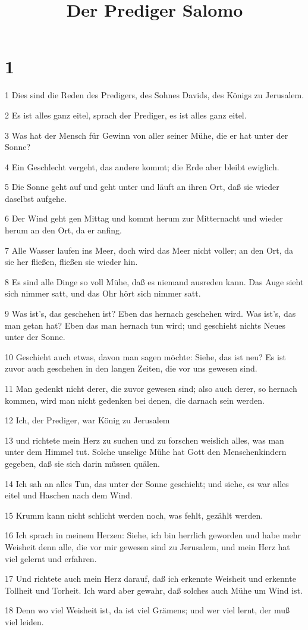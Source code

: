 

\title{Der Prediger Salomo}


\chapter{1}

\par 1 Dies sind die Reden des Predigers, des Sohnes Davids, des Königs zu Jerusalem.
\par 2 Es ist alles ganz eitel, sprach der Prediger, es ist alles ganz eitel.
\par 3 Was hat der Mensch für Gewinn von aller seiner Mühe, die er hat unter der Sonne?
\par 4 Ein Geschlecht vergeht, das andere kommt; die Erde aber bleibt ewiglich.
\par 5 Die Sonne geht auf und geht unter und läuft an ihren Ort, daß sie wieder daselbst aufgehe.
\par 6 Der Wind geht gen Mittag und kommt herum zur Mitternacht und wieder herum an den Ort, da er anfing.
\par 7 Alle Wasser laufen ins Meer, doch wird das Meer nicht voller; an den Ort, da sie her fließen, fließen sie wieder hin.
\par 8 Es sind alle Dinge so voll Mühe, daß es niemand ausreden kann. Das Auge sieht sich nimmer satt, und das Ohr hört sich nimmer satt.
\par 9 Was ist's, das geschehen ist? Eben das hernach geschehen wird. Was ist's, das man getan hat? Eben das man hernach tun wird; und geschieht nichts Neues unter der Sonne.
\par 10 Geschieht auch etwas, davon man sagen möchte: Siehe, das ist neu? Es ist zuvor auch geschehen in den langen Zeiten, die vor uns gewesen sind.
\par 11 Man gedenkt nicht derer, die zuvor gewesen sind; also auch derer, so hernach kommen, wird man nicht gedenken bei denen, die darnach sein werden.
\par 12 Ich, der Prediger, war König zu Jerusalem
\par 13 und richtete mein Herz zu suchen und zu forschen weislich alles, was man unter dem Himmel tut. Solche unselige Mühe hat Gott den Menschenkindern gegeben, daß sie sich darin müssen quälen.
\par 14 Ich sah an alles Tun, das unter der Sonne geschieht; und siehe, es war alles eitel und Haschen nach dem Wind.
\par 15 Krumm kann nicht schlicht werden noch, was fehlt, gezählt werden.
\par 16 Ich sprach in meinem Herzen: Siehe, ich bin herrlich geworden und habe mehr Weisheit denn alle, die vor mir gewesen sind zu Jerusalem, und mein Herz hat viel gelernt und erfahren.
\par 17 Und richtete auch mein Herz darauf, daß ich erkennte Weisheit und erkennte Tollheit und Torheit. Ich ward aber gewahr, daß solches auch Mühe um Wind ist.
\par 18 Denn wo viel Weisheit ist, da ist viel Grämens; und wer viel lernt, der muß viel leiden.

